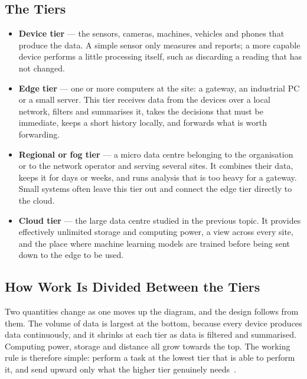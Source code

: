\documentclass[../main.tex]{subfiles}
\begin{document}
\subsection{The Tiers}

\begin{itemize}
  \item \textbf{Device tier} --- the sensors, cameras, machines, vehicles and
        phones that produce the data. A simple sensor only measures and
        reports; a more capable device performs a little processing itself,
        such as discarding a reading that has not changed.
  \item \textbf{Edge tier} --- one or more computers at the site: a gateway,
        an industrial PC or a small server. This tier receives data from the
        devices over a local network, filters and summarises it, takes the
        decisions that must be immediate, keeps a short history locally, and
        forwards what is worth forwarding.
  \item \textbf{Regional or fog tier} --- a micro data centre belonging to the
        organisation or to the network operator and serving several sites. It
        combines their data, keeps it for days or weeks, and runs analysis
        that is too heavy for a gateway. Small systems often leave this tier
        out and connect the edge tier directly to the cloud.
  \item \textbf{Cloud tier} --- the large data centre studied in the previous
        topic. It provides effectively unlimited storage and computing power,
        a view across every site, and the place where machine learning models
        are trained before being sent down to the edge to be used.
\end{itemize}

\subsection{How Work Is Divided Between the Tiers}

Two quantities change as one moves up the diagram, and the design follows
from them. The volume of data is largest at the bottom, because every device
produces data continuously, and it shrinks at each tier as data is filtered
and summarised. Computing power, storage and distance all grow towards the
top. The working rule is therefore simple: perform a task at the lowest tier
that is able to perform it, and send upward only what the higher tier
genuinely needs~.
\end{document}
